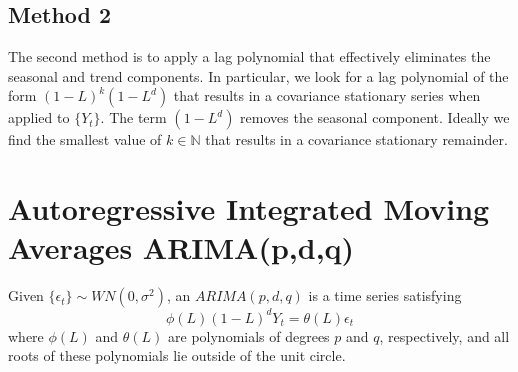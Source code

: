 \documentclass[11pt]{article}
\begin{document}
\subsection{Method 2}
The second method is to apply a lag polynomial that effectively eliminates the seasonal and trend components. In particular, we look for a lag polynomial of the form $\left( 1 - L \right)^k \left( 1 - L^d \right)$ that results in a covariance stationary series when applied to $\{ Y_t \}$. The term $\left( 1 - L^d \right)$ removes the seasonal component. Ideally we find the smallest value of $k \in \mathbb{N}$ that results in a covariance stationary remainder.
\section{Autoregressive Integrated Moving Averages ARIMA(p,d,q)}
Given $\{ \epsilon_t \} \sim WN \left( 0 , \sigma^2 \right)$, an $ARIMA \left( p , d, q \right)$ is a time series satisfying
\begin{equation}
\phi \left( L \right) \left( 1 - L \right)^d Y_t = \theta \left( L \right) \epsilon_t
\end{equation}
where $\phi \left( L \right)$ and $\theta \left( L \right)$ are polynomials of degrees $p$ and $q$, respectively, and all roots of these polynomials lie outside of the unit circle.
\end{document}
